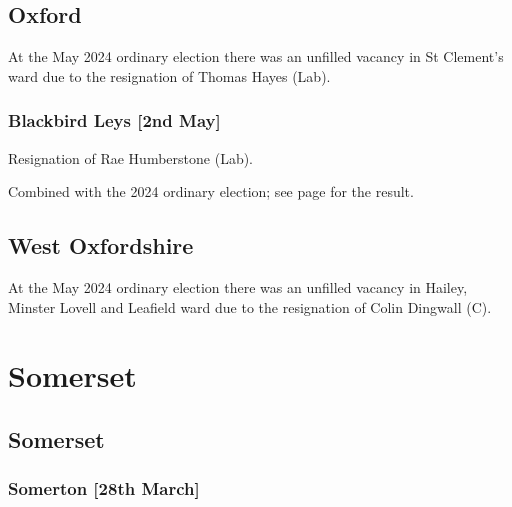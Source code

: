 \documentclass[a4paper,openany]{book}
\begin{document}
\begin{resultsiii}
\subsection*{Oxford}

At the May 2024 ordinary election there was an unfilled vacancy in St Clement's ward due to the resignation of Thomas Hayes (Lab).%

\subsubsection*{Blackbird Leys \hspace*{\fill}\nolinebreak[1]%
	\enspace\hspace*{\fill}
	[2nd May]}


Resignation of Rae Humberstone (Lab).

Combined with the 2024 ordinary election; see page \pageref{BlackbirdLeysOxford} for the result.

\subsection*{West Oxfordshire}

At the May 2024 ordinary election there was an unfilled vacancy in Hailey, Minster Lovell and Leafield ward due to the resignation of Colin Dingwall (C).%

\section{Somerset}

\subsection*{Somerset}

\subsubsection*{Somerton \hspace*{\fill}\nolinebreak[1]%
	\enspace\hspace*{\fill}
	[28th March]}



\end{resultsiii}
\end{document}
